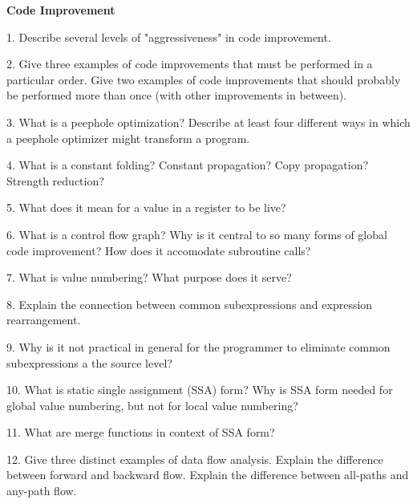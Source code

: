 \centerline{\bf Code Improvement}

\vskip 1cm

1. Describe several levels of "aggressiveness" in code improvement.

\filbreak
\vskip 1cm

2. Give three examples of code improvements that must be performed in a particular order. Give two examples of code improvements that should probably be performed more than once (with other improvements in between).

\filbreak
\vskip 1cm

3. What is a peephole optimization? Describe at least four different ways in which a peephole optimizer might transform a program.

\filbreak
\vskip 1cm

4. What is a constant folding? Constant propagation? Copy propagation? Strength reduction?

\filbreak
\vskip 1cm

5. What does it mean for a value in a register to be live?

\filbreak
\vskip 1cm

6. What is a control flow graph? Why is it central to so many forms of global code improvement? How does it accomodate subroutine calls?

\filbreak
\vskip 1cm

7. What is value numbering? What purpose does it serve?

\filbreak
\vskip 1cm

8. Explain the connection between common subexpressions and expression rearrangement.

\filbreak
\vskip 1cm

9. Why is it not practical in general for the programmer to eliminate common subexpressions a the source level?

\filbreak
\vskip 1cm

10. What is static single assignment (SSA) form? Why is SSA form needed for global value numbering, but not for local value numbering?

\filbreak
\vskip 1cm

11. What are merge functions in context of SSA form?

\filbreak
\vskip 1cm

12. Give three distinct examples of data flow analysis. Explain the difference between forward and backward flow. Explain the difference between all-paths and any-path flow.

